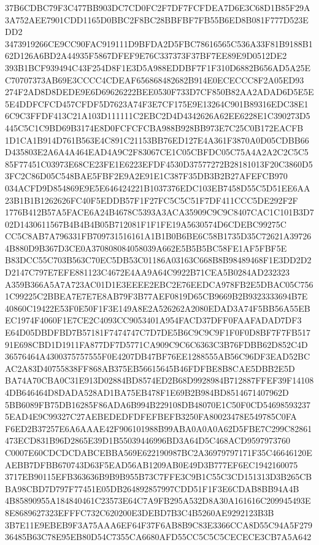 \documentclass[UTF8,fontset=fandol,zihao=-4,a4paper]{ctexart}
\begin{document}
{{37B6CDBC79F3C477BB903DC7CD0FC2F7DF7FCFDEA7D6E3C68D1B85F29A3A752AEE7901CDD1165D0BBC2F8BC28BBFBF7FB55B6ED8B081F777D523EDD2
3473919266CE9CC90FAC919111D9BFDA2D5FBC78616565C536A33F81B9188B162D126A6BD2A44935F5867DFEF9E76C337373F37BF7EE89E9D0512DE2
393B1BCF939494C43F254D8F1E3D5A988EDDBF7F1F310D6882B656AD5A25EC70707373AB69E3CCCC4CDEAF656868482682B914E0ECECCC8F2A05ED93
274F2AD8D8DEDE9E6D69626222BEE0530F733D7CF850B82AA2ADAD6D5E5E5E4DDFCFCD457CFDF5D7623A74F3E7CF175E9E13264C901B89316EDC38E1
6C9C3FFDF413C21A103D111111C2EBC2D4D4342626A62EE6228E1C390273D5445C5C1C9BD69B3174E8D0FCFCFCBA988B928BB973E7C25C0B172EACFB
1D1CA1B914D761B563E4C891C21153BB76ED127E4A361F3870A0D05CDBB66D435803E2A6A4A464EAD4A9C2F83067CE1C05CBFDC05C75A4A2A2C2C5C5
85F77451C03973E68CE23FE1E6223EFDF4530D37577272B28181013F20C3860D53FC2C86D05C548BAE5FBF2E9A2E91E1C387F35DB3B2B27AFEFCB970
034ACFD9D854869E9E5E646424221B1037376EDC103EB7458D55C5D51EE6AA23B1B1B1262626FC40F5EDDB57F1F27FC5C5C51F7DF411CCC5DE292F2F
1776B412B57A5FACE6A24B4678C5393A3ACA35909C9C9C8407CAC1C101B3D702D1430611567B4B4B4B05B712081F1F1FE19A5630574D6CDEBC99275C
CC5C8AB7A796331FB709731516161A1B1B0B6BE6C58B1735D35C72621A397264B880D9B367D3CE0A370808084058039A662E5B5B5BC58FE1AF5FBF5E
B83DCC55C703B563C70EC5DB53C01186A03163C668B8B98489468F1E3DD2D2D2147C797E7EFE881123C4672E4AA9A64C9922B71CEA5B0284AD232323
A359B366A5A7A723AC01D1E3EEEE2EBC2E76EEDCA978FB2E5DBAC05C7561C99225C2BBEA7E7E7E8AB79F3B77AEF0819D65CB9669B2B9323333694B7E
40860C19422E53F0E50F1F3E149A8E2A526262A2080EDAD3A74F5BB56A55EBEC1974F4060F1E7CE2C4093CC9053401A954FACD37DFF0FAAFADAD7DF3
E64D05DBDFBD7B57181F7474747C7D7DE5B6C9C9C9F1F0F0D8BF7F7FB51791E698CBD1D1911FA877DF7D5771CA909C9C6C6363C3B76FDBB62D852C4D
36576464A4300375757555F0E4207DB47BF76EE1288555AB56C96DF3EAD52BCAC2A83D40755838FF868AB375EB56615645B46FDFBE8B8CAE5DBB2E5D
BA74A70CBA0C31E913D02884BD8574ED2B68D9928984B712887FFEF39F141084DB646464D8DADA528AD1BA75EB478F1E69B2B984BD8514671407962D
5BB6089FB75DB16285F86ADA6B994B229108DB48070E1C50F0CD546985932375EAD4E9C99327C27AEBEDEDFDFEFBEFB3250FA80023478E549785C0FA
F6ED2B37257E6A6AAAE42F906101988B99ABA0A0A0A62D5FBE7C299C82861473ECD831B96D2865E39D1B55039446996BD3A64D5C468ACD9597973760
C0007E60CDCDCDABCEBBA569E622190987BC2A36979797171F35C46646120EAEBB7DFBB670743D63F5EAD56AB1209AB0E49D3B777EF6EC1942160075
3717EB90115EFB363636B9B9B955B73C7FFE3C9B1C55C3CD151313D3B265CBBA98CBD7D797F77451E05DB264892857997CDD51F1F3E6CDAB8BB94A4B
4B85890955A184840461C23573E64C7A9FB295A532D8A30A161616C209945493E8E8689627323EFFFC732C620200E3DEBD7B3C4B5260AE9292123B3B
3B7E11E9EBEB9F3A75AAA6EF64F37F6AB8B9C83E3366CCA8D55C94A5F27936485B63C78E95EB80D54C7355CA6680AFD55CC5C5C5CECECE3CB7A5A642
}}
\end{document}
